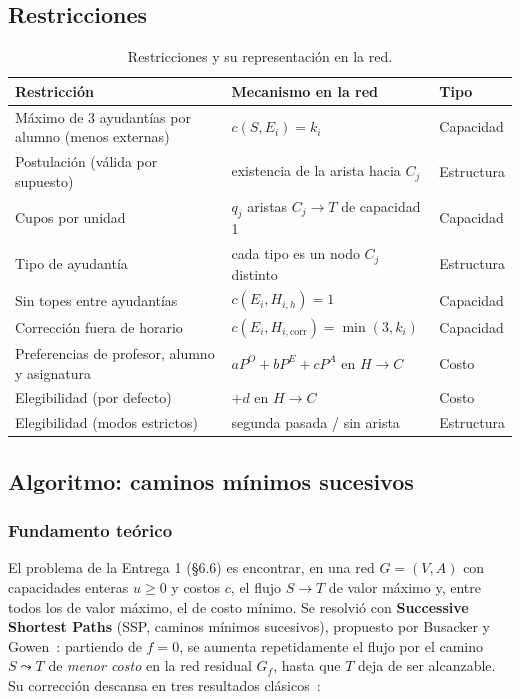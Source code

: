 \documentclass{article}
\begin{document}
\subsection{Restricciones}

\begin{table}[H]
\centering
\small
\begin{tabular}{lll}
\toprule
\textbf{Restricción} & \textbf{Mecanismo en la red} & \textbf{Tipo} \\
\midrule
Máximo de 3 ayudantías por alumno (menos externas) & $c(S, E_i) = k_i$ & Capacidad \\
Postulación (válida por supuesto) & existencia de la arista hacia $C_j$ & Estructura \\
Cupos por unidad & $q_j$ aristas $C_j \to T$ de capacidad 1 & Capacidad \\
Tipo de ayudantía & cada tipo es un nodo $C_j$ distinto & Estructura \\
Sin topes entre ayudantías & $c(E_i, H_{i,h}) = 1$ & Capacidad \\
Corrección fuera de horario & $c(E_i, H_{i,\text{corr}}) = \min(3, k_i)$ & Capacidad \\
Preferencias de profesor, alumno y asignatura & $aP^O + bP^E + cP^A$ en $H \to C$ & Costo \\
Elegibilidad (por defecto) & $+d$ en $H \to C$ & Costo \\
Elegibilidad (modos estrictos) & segunda pasada / sin arista & Estructura \\
\bottomrule
\end{tabular}
\caption{Restricciones y su representación en la red.}
\label{tab:restricciones}
\end{table}

\subsection{Algoritmo: caminos mínimos sucesivos}
\label{sec:algoritmo}

\subsubsection{Fundamento teórico}

El problema de la Entrega 1 (§6.6) es encontrar, en una red $G = (V, A)$ con capacidades enteras $u \geq 0$ y costos $c$, el flujo $S \to T$ de valor máximo y, entre todos los de valor máximo, el de costo mínimo. Se resolvió con \textbf{Successive Shortest Paths} (SSP, caminos mínimos sucesivos), propuesto por Busacker y Gowen~\cite{busacker1960}: partiendo de $f = 0$, se aumenta repetidamente el flujo por el camino $S \leadsto T$ de \emph{menor costo} en la red residual $G_f$, hasta que $T$ deja de ser alcanzable. Su corrección descansa en tres resultados clásicos~\cite{ahuja1993}:
\end{document}

